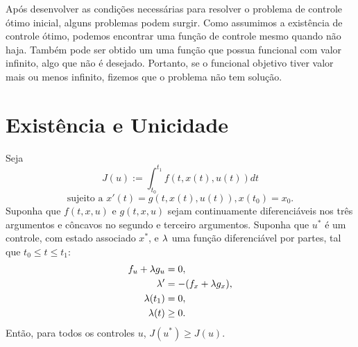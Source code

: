 Após desenvolver as condições necessárias para resolver o problema de controle
ótimo inicial, alguns problemas podem surgir. Como assumimos a existência de
controle ótimo, podemos encontrar uma função de controle mesmo quando não
haja. Também pode ser obtido um uma função que possua funcional com valor
infinito, algo que não é desejado. Portanto, se o funcional objetivo tiver
valor mais ou menos infinito, fizemos que o problema não tem solução. 

\section{Existência e Unicidade}

\begin{theorem}
    Seja $$J(u) := \int_{t_0}^{t_1} f(t,x(t),u(t))dt$$ 
    $$\text{sujeito a } x'(t) = g(t,x(t),u(t)), x(t_0) = x_0.$$ 
    Suponha que $f(t,x,u)$ e $g(t,x,u)$ sejam continuamente diferenciáveis nos
    três argumentos e côncavos no segundo e terceiro argumentos. Suponha que
    $u^*$ é um controle, com estado associado $x^*$, e $\lambda$ uma função
    diferenciável por partes, tal que $t_0 \le t \le t_1$: 
    \begin{subequations}
        \label{eq:conditions}
        \begin{align}
            f_u + \lambda g_u &= 0, \label{rel1} \\
            \lambda ' &= - (f_x + \lambda g_x),  \label{rel2} \\ 
            \lambda(t_1) &= 0, \label{rel3} \\
            \lambda(t) &\ge 0. \label{rel4}
        \end{align}
    \end{subequations}
    Então, para todos os controles $u$, $J(u^*) \ge J(u)$. 
\end{theorem}

